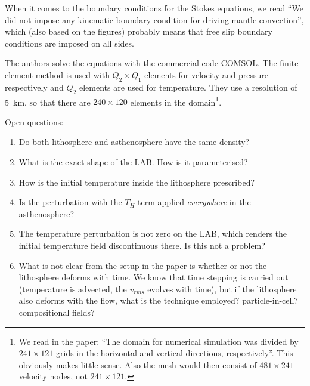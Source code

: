 When it comes to the boundary conditions for the Stokes equations, 
we read ``We did not impose any kinematic boundary condition for driving mantle convection'',
which (also based on the figures) probably means that free slip
boundary conditions are imposed on all sides.

The authors solve the equations with the commercial code COMSOL.
The finite element method is used with $Q_2\times Q_1$ elements for velocity and
pressure respectively and $Q_2$ elements are used for temperature.
They use a resolution of 5~\si{\km}, so that there are $240\times 120$ elements
in the domain\footnote{We read in the paper: ``The domain for numerical simulation was 
divided by $241\times 121$ grids in the horizontal and vertical directions, respectively''.
This obviously makes little sense. Also the mesh would then consist of $481\times 241$
velocity nodes, not $241\times 121$.}.

\vspace{1cm}

Open questions:
\begin{enumerate}
\item Do both lithosphere and asthenosphere have the same density?
\item What is the exact shape of the LAB. How is it parameterised?
\item How is the initial temperature inside the lithosphere prescribed?
\item Is the perturbation with the $T_H$ term applied {\it everywhere} in 
the asthenosphere? 
\item The temperature perturbation is not zero on the LAB, which renders the 
initial temperature field discontinuous there. Is this not a problem?
\item What is not clear from the setup in the paper is whether or not the lithosphere 
deforms with time. We know that time stepping is carried out (temperature is advected,
the $v_{rms}$ evolves with time), but if the lithosphere also deforms with the flow, 
what is the technique employed? particle-in-cell? compositional fields?
\end{enumerate} 







